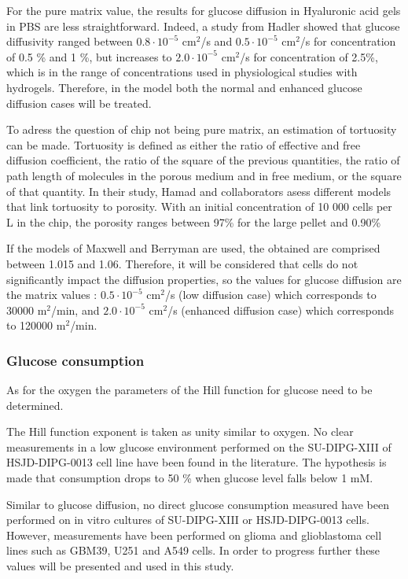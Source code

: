 \documentclass[11pt,a4paper]{article}
\begin{document}
For the pure matrix value, the results for glucose diffusion in Hyaluronic acid gels in PBS are less straightforward. Indeed, a study from Hadler showed that glucose diffusivity ranged between $0.8\cdot 10^{-5}$ cm$^2$/s and $0.5\cdot 10^{-5}$ cm$^2$/s for concentration of 0.5 \% and 1 \%, but increases to $2.0\cdot 10^{-5}$ cm$^2$/s for concentration of 2.5\%, which is in the range of concentrations used in physiological studies with hydrogels.\cite{Gerecht2007} Therefore, in the model both the normal and enhanced glucose diffusion cases will be treated.

To adress the question of chip not being pure matrix, an estimation of tortuosity can be made. Tortuosity is defined as either the ratio of effective and free diffusion coefficient, the ratio of the square of the previous quantities, the ratio of path length of molecules in the porous medium and in free medium, or the square of that quantity. In their study, Hamad and collaborators asess different models that link tortuosity to porosity.\cite{Hamad2018} With an initial concentration of 10 000 cells per \textmu L in the chip, the porosity ranges between 97\% for the large pellet and 0.90\% 

If the models of Maxwell and Berryman are used, the obtained  are comprised between 1.015 and 1.06. Therefore, it will be considered that cells do not significantly impact the diffusion properties, so the values for glucose diffusion are the matrix values : $0.5\cdot 10^{-5}$ cm$^2$/s (low diffusion case) which corresponds to 30000 \textmu m$^2$/min, and $2.0\cdot 10^{-5}$ cm$^2$/s (enhanced diffusion case) which corresponds to 120000 \textmu m$^2$/min.

\subsubsection{Glucose consumption}%
As for the oxygen the parameters of the Hill function for glucose need to be determined. 

The Hill function exponent is taken as unity similar to oxygen. No clear measurements in a low glucose environment performed on the SU-DIPG-XIII of HSJD-DIPG-0013 cell line have been found in the literature. The hypothesis is made that consumption drops to 50 \% when glucose level falls below 1 mM.

Similar to glucose diffusion, no direct glucose consumption measured have been performed on in vitro cultures of SU-DIPG-XIII or HSJD-DIPG-0013 cells. 
However, measurements have been performed on glioma and glioblastoma cell lines such as GBM39, U251 and A549 cells. In order to progress further these values will be presented and used in this study.
\end{document}
